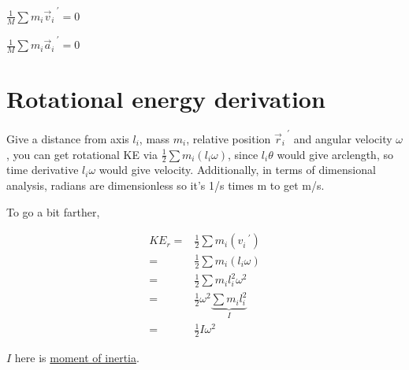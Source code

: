 \documentclass[letterpaper]{article}
\begin{document}
\(\frac{1}{M} \sum m_i \vec{v}_i^{\text{ }\prime} = 0\)

\(\frac{1}{M} \sum m_i \vec{a}_i^{\text{ }\prime} = 0\)


\section{Rotational energy derivation}
\label{sec:org993f416}

Give a distance from axis \(l_i\), mass \(m_i\), relative position \(\vec{r}_i^{\text{ }\prime}\) and angular velocity \(\omega\), you can get rotational KE via \(\frac{1}{2} \sum m_i ( l_i \omega)\), since \(l_i \theta\) would give arclength, so time derivative \(l_i \omega\) would give velocity. Additionally, in terms of dimensional analysis, radians are dimensionless so it's 1/s times m to get m/s.

To go a bit farther,

\begin{align*}
KE_r =& \frac{1}{2} \sum m_i (v_i^{\text{ }\prime}) \\
=&  \frac{1}{2} \sum m_i (l_i \omega) \\
=&  \frac{1}{2} \sum m_i l_i^2 \omega^2 \\
=&  \frac{1}{2} \omega^2 \underbrace{ \sum m_i l_i^2}_{I} \\
=& \frac{1}{2} I \omega^2
\end{align*}

\(I\) here is \href{20210910132702-moment\_of\_inertia.org}{moment of inertia}. 
\end{document}
